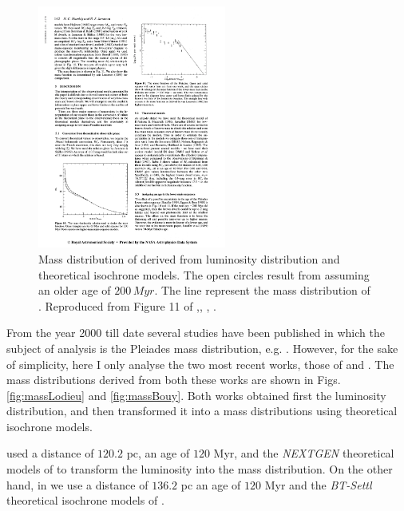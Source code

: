 \begin{figure}[ht!]
\begin{center}
\includegraphics[height=8cm]{background/Figures/F11_Hambly1991.pdf}
\caption{Mass distribution of \citet{Hambly1991} derived from luminosity distribution and theoretical isochrone models. The open circles result from assuming an older age of $200\,Myr$. The line represent the mass distribution of \citet{1980IAUS...85..157V}. Reproduced from Figure 11 of \citet{Hambly1991},\textit{}, , .}
\label{fig:massHambly}
\end{center}
\end{figure}

From the year 2000 till date several studies have been published in which the subject of analysis is the Pleiades mass distribution, e.g. \citet{2000ASPC..198...59H, 2002MNRAS.335..853J, 2003A&A...400..891M, 2004A&A...426...75M, 2007MNRAS.380..712L}. However, for the sake of simplicity, here I only analyse the two most recent works, those of \citet{Lodieu2012} and \citet{Bouy2015}. The mass distributions derived from both these works are shown in Figs. \ref{fig:massLodieu} and \ref{fig:massBouy}. Both works obtained first the luminosity distribution, and then transformed it into a mass distributions using theoretical isochrone models. 

\citet{Lodieu2012} used a distance of $120.2$ pc, an age of $120$ Myr, and the \emph{NEXTGEN} theoretical models of \citet{1998A&A...337..403B} to transform the luminosity into the mass distribution. On the other hand, in \citet{Bouy2015} we use a distance of $136.2$ pc an age of $120$ Myr and the \emph{BT-Settl} theoretical isochrone models of \citet{2014IAUS..299..271A}. 


